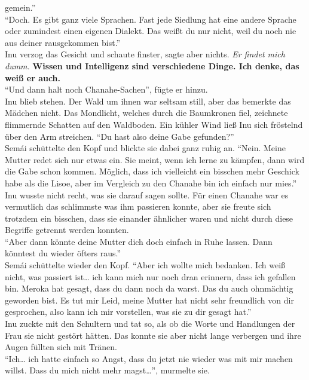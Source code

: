 gemein.''\\
``Doch. Es gibt ganz viele Sprachen. Fast jede Siedlung hat eine andere Sprache oder zumindest 
einen eigenen Dialekt. Das weißt du nur nicht, weil du noch nie aus deiner rausgekommen bist.''\\
Inu verzog das Gesicht und schaute finster, sagte aber nichts. \textit{Er findet mich dumm.}
\textbf{Wissen und Intelligenz sind verschiedene Dinge. Ich denke, das weiß er auch.}\\
``Und dann halt noch Chanahe-Sachen'', fügte er hinzu.\\
Inu blieb stehen. Der Wald um ihnen war seltsam still, aber das bemerkte das Mädchen nicht. Das 
Mondlicht, welches durch die Baumkronen fiel, zeichnete flimmernde Schatten auf den Waldboden. Ein 
kühler Wind ließ Inu sich fröstelnd über den Arm streichen. ``Du hast also deine Gabe gefunden?''\\
Semái schüttelte den Kopf und blickte sie dabei ganz ruhig an. ``Nein. Meine Mutter redet sich nur 
etwas ein. Sie meint, wenn ich lerne zu kämpfen, dann wird die Gabe schon kommen. Möglich, dass ich 
vielleicht ein bisschen mehr Geschick habe als die Lisoe, aber im Vergleich zu den Chanahe bin ich 
einfach nur mies.''\\
Inu wusste nicht recht, was sie darauf sagen sollte. Für einen Chanahe war es vermutlich das 
schlimmste was ihm passieren konnte, aber sie freute sich trotzdem ein bisschen, dass sie einander 
ähnlicher waren und nicht durch diese Begriffe getrennt werden konnten. \\
``Aber dann könnte deine Mutter dich doch einfach in Ruhe lassen. Dann könntest du wieder öfters 
raus.''\\
Semái schüttelte wieder den Kopf. ``Aber ich wollte mich bedanken. Ich weiß nicht, was passiert 
ist… ich kann mich nur noch dran erinnern, dass ich gefallen bin. Meroka hat gesagt, dass du dann 
noch da warst. Das du auch ohnmächtig geworden bist. Es tut mir Leid, meine Mutter hat nicht sehr 
freundlich von dir gesprochen, also kann ich mir vorstellen, was sie zu dir gesagt hat.''\\
Inu zuckte mit den Schultern und tat so, als ob die Worte und Handlungen der Frau sie nicht gestört 
hätten. Das konnte sie aber nicht lange verbergen und ihre Augen füllten sich mit Tränen. \\
``Ich… ich hatte einfach so Angst, dass du jetzt nie wieder was mit mir machen willst. Dass du mich 
nicht mehr magst…'', murmelte sie. \\
